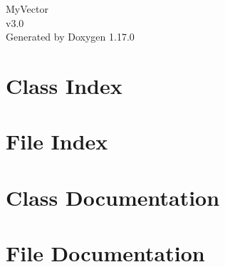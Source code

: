 \documentclass[twoside]{book}
\newcommand{\+}{\discretionary{\mbox{\scriptsize$\hookleftarrow$}}{}{}}
\newcommand{\clearemptydoublepage}{%
    \newpage{\pagestyle{empty}\cleardoublepage}%
  }
\begin{document}
  \raggedbottom
    \hypersetup{pageanchor=false,
                bookmarksnumbered=true,
                pdfencoding=unicode
               }
  \begin{titlepage}
  \vspace*{7cm}
  \begin{center}%
  {\Large My\+Vector}\\
  [1ex]\large v3.\+0 \\
  \vspace*{1cm}
  {\large Generated by Doxygen 1.17.0}\\
  \end{center}
  \end{titlepage}
  \clearemptydoublepage
  \tableofcontents
  \clearemptydoublepage
  \hypersetup{pageanchor=true}
\chapter{Class Index}

\chapter{File Index}

\chapter{Class Documentation}

\chapter{File Documentation}


  \backmatter
  \newpage
  \clearemptydoublepage
  \printindex
\end{document}
